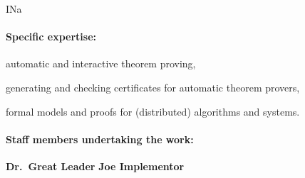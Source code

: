 \begin{sitedescription}{INa}
\paragraph{Specific expertise:}

\begin{compactitem}
\item automatic and interactive theorem proving,
\item generating and checking certificates for automatic theorem provers,
\item formal models and proofs for (distributed) algorithms and systems.
\end{compactitem}

\paragraph{Staff members undertaking the work:}

\textbf{Dr.\ Great Leader}
\textbf{Joe Implementor}
\end{sitedescription}


